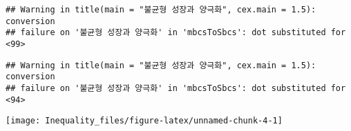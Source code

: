 \documentclass[
]{article}
\begin{document}
\begin{verbatim}
## Warning in title(main = "불균형 성장과 양극화", cex.main = 1.5): conversion
## failure on '불균형 성장과 양극화' in 'mbcsToSbcs': dot substituted for <99>
\end{verbatim}

\begin{verbatim}
## Warning in title(main = "불균형 성장과 양극화", cex.main = 1.5): conversion
## failure on '불균형 성장과 양극화' in 'mbcsToSbcs': dot substituted for <94>
\end{verbatim}

\begin{center}\texttt{[image: Inequality\_files/figure-latex/unnamed-chunk-4-1]} \end{center}
\end{document}
